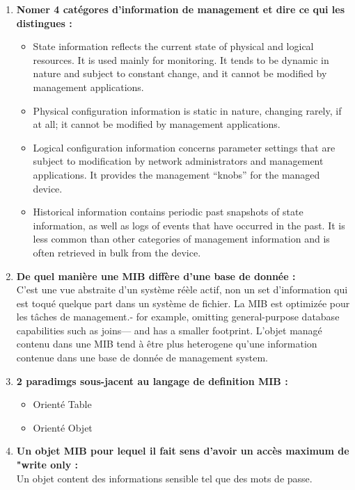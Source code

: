 \documentclass[12pt,landscape]{article}
\begin{document}
\begin{multicols}{2}
\begin{enumerate}
\item \textbf{Nomer 4 catégores d'information de management et dire ce qui les distingues :}
\begin{itemize}
\item State information reflects the current state of physical and logical resources. It is
used mainly for monitoring. It tends to be dynamic in nature and subject to constant change,
and it cannot be modified by management applications.
\item Physical configuration information is static in nature, changing rarely, if at all; it cannot be
modified by management applications.
\item Logical configuration information concerns parameter settings that are subject to
modification by network administrators and management applications. It provides the
management “knobs” for the managed device.
\item Historical information contains periodic past snapshots of state information, as well as logs
of events that have occurred in the past. It is less common than other categories of
management information and is often retrieved in bulk from the device.
\end{itemize}

\item \textbf{De quel manière une MIB diffère d'une base de donnée :}\\
C'est une vue abstraite d'un système réèle actif, non un set d'information qui est toqué quelque part dans un système de fichier. La MIB est optimizée pour les tâches de management.- for example, omitting general-purpose database capabilities such as joins—
and has a smaller footprint. L'objet managé contenu dans une MIB tend à être plus heterogene qu'une information contenue dans une base de donnée de management system.

\item \textbf{2 paradimgs sous-jacent au langage de definition MIB : }\\
\begin{itemize}
\item Orienté Table
\item Orienté Objet
\end{itemize}

\item \textbf{Un objet MIB pour lequel il fait sens d'avoir un accès  maximum de "write only :}\\
Un objet content des informations sensible tel que des mots de passe.


\end{enumerate}
\end{multicols}
\end{document}
